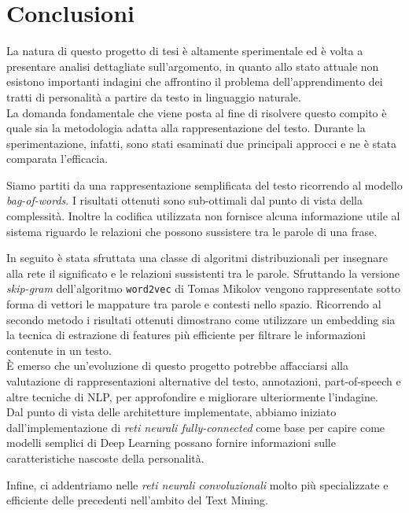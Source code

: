 \chapter{Conclusioni}
\label{chap:conclusioni}

La natura di questo progetto di tesi è altamente sperimentale ed è volta a presentare analisi dettagliate sull'argomento, in quanto allo stato attuale non esistono importanti indagini che affrontino il problema dell'apprendimento dei tratti di personalità a partire da testo in linguaggio naturale.
\\

La domanda fondamentale che viene posta al fine di risolvere questo compito è quale sia la metodologia adatta alla rappresentazione del testo.
Durante la sperimentazione, infatti, sono stati esaminati due principali approcci e ne è stata comparata l'efficacia.

Siamo partiti da una rappresentazione semplificata del testo ricorrendo al modello \emph{bag-of-words}. 
I risultati ottenuti sono sub-ottimali dal punto di vista della complessità. Inoltre la codifica utilizzata non fornisce alcuna informazione utile al sistema riguardo le relazioni che possono sussistere tra le parole di una frase.

In seguito è stata sfruttata una classe di algoritmi distribuzionali per insegnare alla rete il significato e le relazioni sussistenti tra le parole. Sfruttando la versione \emph{skip-gram} dell'algoritmo \texttt{word2vec} di Tomas Mikolov vengono rappresentate sotto forma di vettori le mappature tra parole e contesti nello spazio. 
Ricorrendo al secondo metodo i risultati ottenuti dimostrano come utilizzare un embedding sia la tecnica di estrazione di features più efficiente per filtrare le informazioni contenute in un testo.\\

È emerso che un'evoluzione di questo progetto potrebbe affacciarsi alla valutazione di rappresentazioni alternative del testo, annotazioni, part-of-speech e altre tecniche di NLP, per approfondire e migliorare ulteriormente l'indagine.\\

Dal punto di vista delle architetture implementate, abbiamo iniziato dall'implementazione di \emph{reti neurali fully-connected} come base per capire come modelli semplici di Deep Learning possano fornire informazioni sulle caratteristiche nascoste della personalità. 

Infine, ci addentriamo nelle \emph{reti neurali convoluzionali} molto più specializzate e efficiente delle precedenti nell'ambito del Text Mining.

